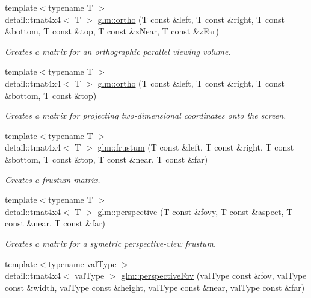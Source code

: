 \begin{DoxyCompactItemize}
{\footnotesize template$<$typename T $>$ }\\detail\-::tmat4x4$<$ T $>$ \hyperlink{group__gtc__matrix__transform_gaf039a9f8d24e4bf39d30b7d692c1b8c3}{glm\-::ortho} (T const \&left, T const \&right, T const \&bottom, T const \&top, T const \&z\-Near, T const \&z\-Far)
\begin{DoxyCompactList}\small\item\em Creates a matrix for an orthographic parallel viewing volume. \end{DoxyCompactList}\item 
{\footnotesize template$<$typename T $>$ }\\detail\-::tmat4x4$<$ T $>$ \hyperlink{group__gtc__matrix__transform_gac7cbb65a7853eb6db00d46125595b732}{glm\-::ortho} (T const \&left, T const \&right, T const \&bottom, T const \&top)
\begin{DoxyCompactList}\small\item\em Creates a matrix for projecting two-\/dimensional coordinates onto the screen. \end{DoxyCompactList}\item 
{\footnotesize template$<$typename T $>$ }\\detail\-::tmat4x4$<$ T $>$ \hyperlink{group__gtc__matrix__transform_ga2a5b0a83f78884d9cf3cc1ba99131299}{glm\-::frustum} (T const \&left, T const \&right, T const \&bottom, T const \&top, T const \&near, T const \&far)
\begin{DoxyCompactList}\small\item\em Creates a frustum matrix. \end{DoxyCompactList}\item 
{\footnotesize template$<$typename T $>$ }\\detail\-::tmat4x4$<$ T $>$ \hyperlink{group__gtc__matrix__transform_ga283629a5ac7fb9037795435daf22560f}{glm\-::perspective} (T const \&fovy, T const \&aspect, T const \&near, T const \&far)
\begin{DoxyCompactList}\small\item\em Creates a matrix for a symetric perspective-\/view frustum. \end{DoxyCompactList}\item 
{\footnotesize template$<$typename val\-Type $>$ }\\detail\-::tmat4x4$<$ val\-Type $>$ \hyperlink{group__gtc__matrix__transform_gac2bbb4ae38c7cc549feefae5406517d7}{glm\-::perspective\-Fov} (val\-Type const \&fov, val\-Type const \&width, val\-Type const \&height, val\-Type const \&near, val\-Type const \&far)

\end{DoxyCompactItemize}
